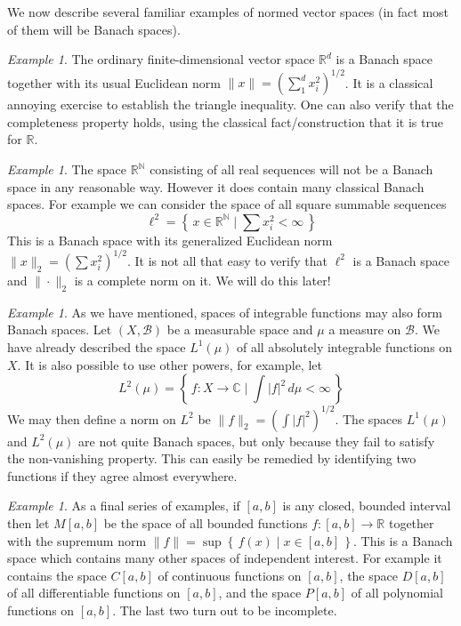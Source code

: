 \documentclass[11pt,oneside]{amsbook}
\newcommand{\set}[1]{\left\{\,#1\,\right\}}
\newcommand{\NN}{{\mathbb N}}
\newcommand{\RR}{{\mathbb R}}
\newcommand{\CC}{{\mathbb C}}
\theoremstyle{definition}
\theoremstyle{plain}
\theoremstyle{definition}
\theoremstyle{remark}
\newtheorem{example}[thm]{Example}
\numberwithin{equation}{section}
\numberwithin{figure}{section}
\begin{document}
We now describe several familiar examples of normed vector spaces (in fact most of them will be Banach spaces).

\begin{example}
  The ordinary finite-dimensional vector space $\RR^d$ is a Banach space together with its usual Euclidean norm $\|x\|=\left(\sum_1^dx_i^2\right)^{1/2}$. It is a classical annoying exercise to establish the triangle inequality. One can also verify that the completeness property holds, using the classical fact/construction that it is true for $\RR$.
\end{example}

\begin{example}
  The space $\RR^\NN$ consisting of all real sequences will not be a Banach space in any reasonable way. However it does contain many classical Banach spaces. For example we can consider the space of all square summable sequences
  \[\ell^2=\set{x\in\RR^\NN\mid\sum x_i^2<\infty}
  \]
  This is a Banach space with its generalized Euclidean norm $\|x\|_2=\left(\sum x_i^2\right)^{1/2}$. It is not all that easy to verify that $\ell^2$ is a Banach space and $\|\cdot\|_2$ is a complete norm on it. We will do this later!
\end{example}

\begin{example}
  As we have mentioned, spaces of integrable functions may also form Banach spaces. Let $(X,\mathcal B)$ be a measurable space and $\mu$ a measure on $\mathcal B$. We have already described the space $L^1(\mu)$ of all absolutely integrable functions on $X$. It is also possible to use other powers, for example, let
  \[L^2(\mu)=\set{f\colon X\to\CC\mid \int|f|^2\,d\mu<\infty}
  \]
  We may then define a norm on $L^2$ be $\|f\|_2=\left(\int|f|^2\right)^{1/2}$. The spaces $L^1(\mu)$ and $L^2(\mu)$ are not quite Banach spaces, but only because they fail to satisfy the non-vanishing property. This can easily be remedied by identifying two functions if they agree almost everywhere.
\end{example}

\begin{example}
  As a final series of examples, if $[a,b]$ is any closed, bounded interval then let $M[a,b]$ be the space of all bounded functions $f\colon[a,b]\to\RR$ together with the supremum norm $\|f\|=\sup\set{f(x)\mid x\in[a,b]}$. This is a Banach space which contains many other spaces of independent interest. For example it contains the space $C[a,b]$ of continuous functions on $[a,b]$, the space $D[a,b]$ of all differentiable functions on $[a,b]$, and the space $P[a,b]$ of all polynomial functions on $[a,b]$. The last two turn out to be incomplete.
\end{example}
\end{document}
